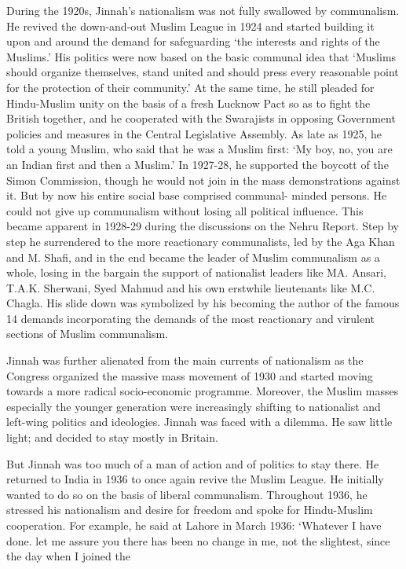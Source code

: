 During the 1920s, Jinnah’s nationalism was not fully swallowed by communalism. He revived the down-and-out Muslim League in 1924 and started building it upon and around the demand for safeguarding ‘the interests and rights of the Muslims.’ His politics were now based on the basic communal idea that ‘Muslims should organize themselves, stand united and should press every reasonable point for the protection of their community.’ At the same time, he still pleaded for Hindu-Muslim unity on the basis of a fresh Lucknow Pact so as to fight the British together, and he cooperated with the Swarajists in opposing Government policies and measures in the Central Legislative Assembly. As late as 1925, he told a young Muslim, who said that he was a Muslim first: ‘My boy, no, you are an Indian first and then a Muslim.’ In 1927-28, he supported the boycott of the Simon Commission, though he would not join in the mass demonstrations against it. But by now his entire social base comprised communal- minded persons. He could not give up communalism without losing all political influence. This became apparent in 1928-29 during the discussions on the Nehru Report. Step by step he surrendered to the more reactionary communalists, led by the Aga Khan and M. Shafi, and in the end became the leader of Muslim communalism as a whole, losing in the bargain the support of nationalist leaders like MA. Ansari, T.A.K. Sherwani, Syed Mahmud and his own erstwhile lieutenants like M.C. Chagla. His slide down was symbolized by his becoming the author of the famous 14 demands incorporating the demands of the most reactionary and virulent sections of Muslim communalism. 

Jinnah was further alienated from the main currents of nationalism as the Congress organized the massive mass movement of 1930 and started moving towards a more radical socio-economic programme. Moreover, the Muslim masses especially the younger generation were increasingly shifting to nationalist and left-wing politics and ideologies. Jinnah was faced with a dilemma. He saw little light; and decided to stay mostly in Britain. 

But Jinnah was too much of a man of action and of politics to stay there. He returned to India in 1936 to once again revive the Muslim League. He initially wanted to do so on the basis of liberal communalism. Throughout 1936, he stressed his nationalism and desire for freedom and spoke for Hindu-Muslim cooperation. For example, he said at Lahore in March 1936: ‘Whatever I have done. let me assure you there has been no change in me, not the slightest, since the day when I joined the 

